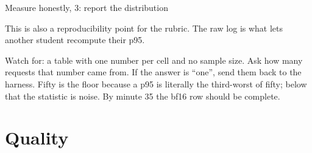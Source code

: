 \documentclass[aspectratio=169,10pt]{beamer}
\begin{document}
\begin{frame}{Measure honestly, 3: report the distribution}
{  This is also a reproducibility point for the rubric. The raw log is what lets
  another student recompute their p95.

  Watch for: a table with one number per cell and no sample size. Ask how many
  requests that number came from. If the answer is ``one'', send them back to
  the harness. Fifty is the floor because a p95 is literally the third-worst of
  fifty; below that the statistic is noise.
  By minute 35 the bf16 row should be complete.}
\end{frame}

\section{Quality}
\end{document}
